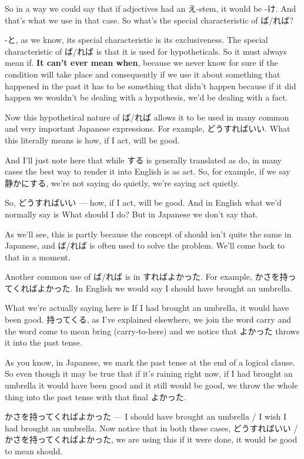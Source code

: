 So in a way we could say that if adjectives had an え-stem, it would be -け. And that's what we use in that case. So what's the special characteristic of ば/れば?

-と, as we know, its special characteristic is its exclusiveness. The special characteristic of ば/れば is that it is used for hypotheticals. So it must always mean if. {\bf It can't ever mean when}, because we never know for sure if the condition will take place and consequently if we use it about something that happened in the past it has to be something that didn't happen because if it did happen we wouldn't be dealing with a hypothesis, we'd be dealing with a fact.

Now this hypothetical nature of ば/れば allows it to be used in many common and very important Japanese expressions. For example, どうすればいい. What this literally means is how, if I act, will be good.

And I'll just note here that while する is generally translated as do, in many cases the best way to render it into English is as act. So, for example, if we say 静かにする, we're not saying do quietly, we're saying act quietly.

So, どうすればいい --- how, if I act, will be good. And in English what we'd normally say is What should I do? But in Japanese we don't say that.

As we'll see, this is partly because the concept of should isn't quite the same in Japanese, and ば/れば is often used to solve the problem. We'll come back to that in a moment.

Another common use of ば/れば is in すればよかった. For example, かさを持ってくればよかった. In English we would say I should have brought an umbrella.

What we're actually saying here is If I had brought an umbrella, it would have been good. 持ってくる, as I've explained elsewhere, we join the word carry and the word come to mean bring (carry-to-here) and we notice that よかった throws it into the past tense.

As you know, in Japanese, we mark the past tense at the end of a logical clause. So even though it may be true that if it's raining right now, if I had brought an umbrella it would have been good and it still would be good, we throw the whole thing into the past tense with that final よかった.

かさを持ってくればよかった --- I should have brought an umbrella / I wish I had brought an umbrella. Now notice that in both these cases, どうすればいい / かさを持ってくればよかった, we are using this if it were done, it would be good to mean should.

